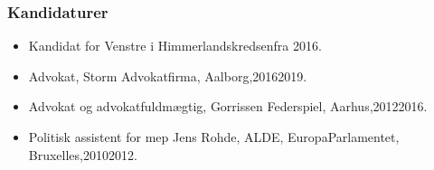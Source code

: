 \documentclass[11pt, a4paper]{awesome-cv}
\begin{document}
\begin{cvletter}
\subsubsection*{Kandidaturer}
\begin{itemize}
\item Kandidat for Venstre i Himmerlandskredsenfra 2016.
\end{itemize}
\begin{itemize}
\item Advokat, Storm Advokatfirma, Aalborg,20162019.
\item Advokat og advokatfuldmægtig, Gorrissen Federspiel, Aarhus,20122016.
\item Politisk assistent for mep Jens Rohde, ALDE, EuropaParlamentet, Bruxelles,20102012.
\end{itemize}
\end{cvletter}
\end{document}
